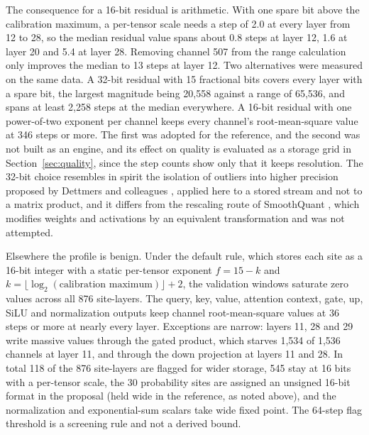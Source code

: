 \documentclass[11pt]{article}
\begin{document}
The consequence for a 16-bit residual is arithmetic. With one spare bit above the calibration maximum, a per-tensor scale needs a step of 2.0 at every layer from 12 to 28, so the median residual value spans about 0.8 steps at layer 12, 1.6 at layer 20 and 5.4 at layer 28. Removing channel 507 from the range calculation only improves the median to 13 steps at layer 12. Two alternatives were measured on the same data. A 32-bit residual with 15 fractional bits covers every layer with a spare bit, the largest magnitude being 20,558 against a range of 65,536, and spans at least 2,258 steps at the median everywhere. A 16-bit residual with one power-of-two exponent per channel keeps every channel's root-mean-square value at 346 steps or more. The first was adopted for the reference, and the second was not built as an engine, and its effect on quality is evaluated as a storage grid in Section~\ref{sec:quality}, since the step counts show only that it keeps resolution. The 32-bit choice resembles in spirit the isolation of outliers into higher precision proposed by Dettmers and colleagues \cite{dettmers2022}, applied here to a stored stream and not to a matrix product, and it differs from the rescaling route of SmoothQuant \cite{xiao2023smooth}, which modifies weights and activations by an equivalent transformation and was not attempted.

Elsewhere the profile is benign. Under the default rule, which stores each site as a 16-bit integer with a static per-tensor exponent $f=15-k$ and $k=\lfloor\log_2(\text{calibration maximum})\rfloor+2$, the validation windows saturate zero values across all 876 site-layers. The query, key, value, attention context, gate, up, SiLU and normalization outputs keep channel root-mean-square values at 36 steps or more at nearly every layer. Exceptions are narrow: layers 11, 28 and 29 write massive values through the gated product, which starves 1,534 of 1,536 channels at layer 11, and through the down projection at layers 11 and 28. In total 118 of the 876 site-layers are flagged for wider storage, 545 stay at 16 bits with a per-tensor scale, the 30 probability sites are assigned an unsigned 16-bit format in the proposal (held wide in the reference, as noted above), and the normalization and exponential-sum scalars take wide fixed point. The 64-step flag threshold is a screening rule and not a derived bound.
\end{document}
